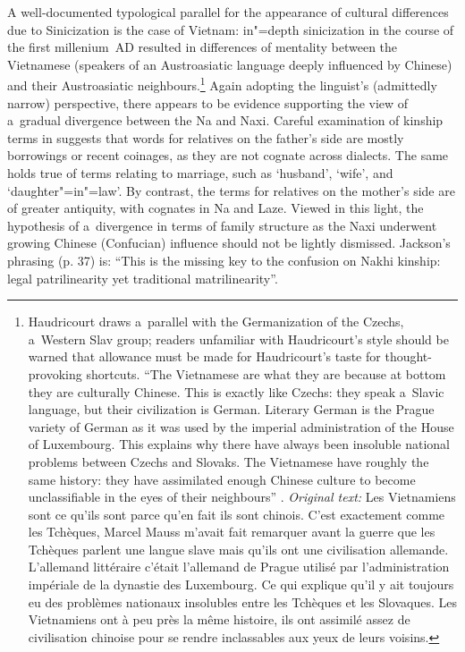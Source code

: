 \largerpage[-2]
A well-documented typological parallel for the appearance of cultural differences due to Sinicization is the case of Vietnam: in"=depth sinicization in the course of the first millenium \,AD resulted in differences of mentality between the Vietnamese (speakers of an Austroasiatic language deeply influenced by Chinese) and their Austroasiatic neighbours.\footnote{Haudricourt draws a~parallel with the Germanization of the Czechs, a~Western Slav group; readers unfamiliar with Haudricourt's style should be warned that allowance must be made for Haudricourt's taste for thought-provoking shortcuts. “The Vietnamese are what they are because at bottom they are culturally Chinese. This is exactly like Czechs: they speak a~Slavic language, but their civilization is German. Literary German is the Prague variety of German as it was used by the imperial administration of the House of Luxembourg. This explains why there have always been insoluble national problems between Czechs and Slovaks. The Vietnamese have roughly the same history: they have assimilated enough Chinese culture to become unclassifiable in the eyes of their neighbours” \citep[97-98]{haudricourtetal1987}. \textit{Original text:} Les Vietnamiens sont ce qu'ils sont parce qu'en fait ils sont chinois. C'est exactement comme les Tchèques, Marcel Mauss m'avait fait remarquer avant la guerre que les Tchèques parlent une langue slave mais qu'ils ont une civilisation allemande. L'allemand littéraire c'était l'allemand de Prague utilisé par l'administration impériale de la dynastie des Luxembourg. Ce qui explique qu'il y ait toujours eu des problèmes nationaux insolubles entre les Tchèques et les Slovaques. Les Vietnamiens ont à peu près la même histoire, ils ont assimilé assez de civilisation chinoise pour se rendre inclassables aux yeux de leurs voisins.} 
Again adopting the linguist’s (admittedly narrow) perspective, there appears to be evidence supporting the view of a~gradual divergence between the Na and Naxi. Careful examination of kinship terms in  suggests that words for relatives on the
father’s side are mostly borrowings or recent coinages, as they are not cognate across dialects. The same holds true of terms relating to
marriage, such as ‘husband’, ‘wife’, and ‘daughter"=in"=law’. By contrast, the terms for relatives on
the mother’s side are of greater antiquity, with cognates in Na and {Laze}. Viewed in this light, the hypothesis of a~divergence in terms of family structure as the {Naxi} underwent growing Chinese (Confucian) influence
should not be lightly dismissed. Jackson’s {phrasing} (p. 37) is: “This is the missing key to the
confusion on Nakhi kinship: legal patrilinearity yet traditional matrilinearity”.


